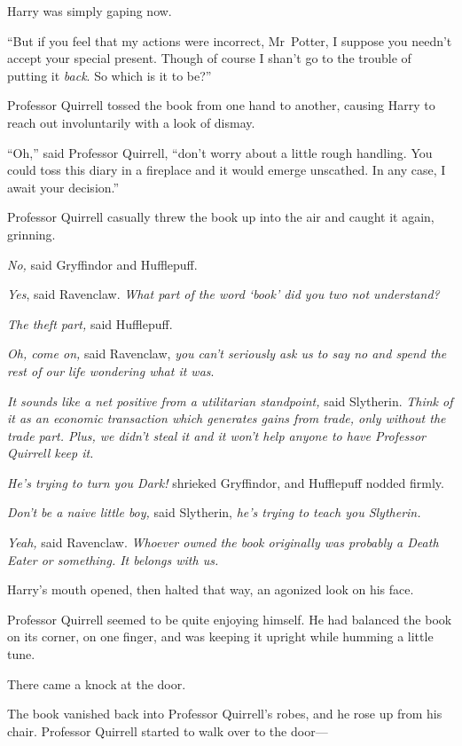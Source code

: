 Harry was simply gaping now.

“But if you feel that my actions were incorrect, Mr~Potter, I suppose you needn’t accept your special present. Though of course I shan’t go to the trouble of putting it \emph{back}. So which is it to be?”

Professor Quirrell tossed the book from one hand to another, causing Harry to reach out involuntarily with a look of dismay.

“Oh,” said Professor Quirrell, “don’t worry about a little rough handling. You could toss this diary in a fireplace and it would emerge unscathed. In any case, I await your decision.”

Professor Quirrell casually threw the book up into the air and caught it again, grinning.

\emph{No,} said Gryffindor and Hufflepuff.

\emph{Yes}, said Ravenclaw. \emph{What part of the word ‘book’ did you two not understand?}

\emph{The theft part,} said Hufflepuff.

\emph{Oh, come on,} said Ravenclaw, \emph{you can’t seriously ask us to say no and spend the rest of our life wondering what it was}.

\emph{It sounds like a net positive from a utilitarian standpoint,} said Slytherin. \emph{Think of it as an economic transaction which generates gains from trade, only without the trade part. Plus, \emph{we} didn’t steal it and it won’t help anyone to have Professor Quirrell keep it.}

\emph{He’s trying to turn you Dark!} shrieked Gryffindor, and Hufflepuff nodded firmly.

\emph{Don’t be a naive little boy,} said Slytherin, \emph{he’s trying to teach you Slytherin.}

\emph{Yeah,} said Ravenclaw. \emph{Whoever owned the book originally was probably a Death Eater or something. It belongs with us.}

Harry’s mouth opened, then halted that way, an agonized look on his face.

Professor Quirrell seemed to be quite enjoying himself. He had balanced the book on its corner, on one finger, and was keeping it upright while humming a little tune.

There came a knock at the door.

The book vanished back into Professor Quirrell’s robes, and he rose up from his chair. Professor Quirrell started to walk over to the door—


